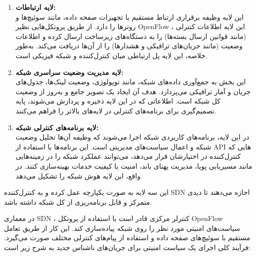 \begin{enumerate}
	\item \textbf{لایه ارتباطات:} \\
	این لایه وظیفه برقراری ارتباط مستقیم با تجهیزات صفحه داده، مانند سوئیچ‌ها و روترها را دارد. از طریق پروتکل‌هایی نظیر OpenFlow ، این لایه اطلاعات کنترلی (مانند قوانین ارسال بسته‌ها) را به دستگاه‌های زیرساخت ارسال کرده و اطلاعات وضعیت (مانند جریان‌های ترافیکی و هشدارها) را از آن‌ها دریافت می‌کند. به‌طور خلاصه، این لایه پل ارتباطی میان کنترل‌کننده و شبکه فیزیکی است.
	
	\item \textbf{لایه مدیریت وضعیت سراسری شبکه:} \\
	این بخش به جمع‌آوری داده‌های شبکه، مانند توپولوژی، وضعیت لینک‌ها، جدول‌های جریان و آمار ترافیکی می‌پردازد. هدف آن ایجاد یک تصویر جامع و به‌روز از وضعیت کل شبکه است. اطلاعاتی که در این لایه ذخیره و پردازش می‌شوند، پایه تصمیم‌گیری برای برنامه‌های کنترلی در لایه‌های بالاتر را فراهم می‌کنند.
	
	\item \textbf{لایه برنامه‌های کنترلی شبکه:} \\
	در این لایه، برنامه‌های کاربردی شبکه اجرا می‌شوند که وظیفه آن‌ها تحلیل وضعیت شبکه و اعمال سیاست‌های مدیریتی است. این برنامه‌ها با استفاده از API هایی که کنترل‌کننده در اختیارشان قرار می‌دهد، می‌توانند عملکرد شبکه را در زمینه‌هایی مانند مسیریابی پویا، مدیریت پهنای باند، امنیت یا کیفیت خدمات بهینه‌سازی کنند. در واقع، این لایه هوش شبکه را تشکیل می‌دهد.
\end{enumerate}

این سه لایه به صورت یکپارچه عمل کرده و به کنترل‌کننده SDN اجازه می‌دهند تا دیدی متمرکز و قابل برنامه‌ریزی از کل شبکه داشته باشد.

 \pagebreak
 
 




در معماری SDN ، کنترلر مرکزی قادر است با استفاده از پروتکل OpenFlow سیاست‌های امنیتی مورد نظر را روی شبکه پیاده‌سازی کند. این کار از طریق تعامل مستقیم با سوئیچ‌های صفحه داده و استفاده از پیام‌های کنترلی مختلف صورت می‌گیرد. فرآیند کلی اجرای یک سیاست امنیتی برای جریان‌های ناشناس جدید به شرح زیر است:

